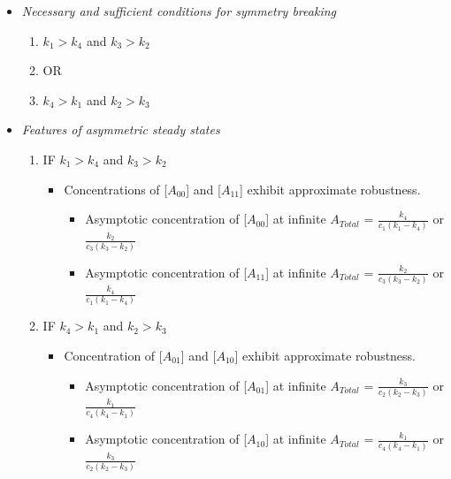 \documentclass[9pt,lineno]{elife}
\begin{document}
\begin{appendixbox}
\begin{itemize}
    \item \textit{Necessary and sufficient conditions for symmetry breaking}
        \begin{enumerate}
            \item $k_1 > k_4$ and $k_3 > k_2$ 
            \item[] \hspace{10mm} OR
            \item $k_4 > k_1$ and $k_2 > k_3$ 
        \end{enumerate}
    \item \textit{Features of asymmetric steady states}
    \begin{enumerate}
        \item IF $k_1 > k_4$ and $k_3 > k_2$ 
            \begin{itemize}
                \item Concentrations of [$A_{00}$] and [$A_{11}$] exhibit approximate robustness.
                    \begin{itemize}
                        \item Asymptotic concentration of [$A_{00}$] at infinite $A_{Total}$ = $\frac{k_4}{c_1(k_1-k_4)}$ or $\frac{k_2}{c_3(k_3-k_2)}$
                        \item Asymptotic concentration of [$A_{11}$] at infinite $A_{Total}$ = $\frac{k_2}{c_3(k_3-k_2)}$ or $\frac{k_4}{c_1(k_1-k_4)}$
                    \end{itemize}
            \end{itemize}
        \item IF $k_4 > k_1$ and $k_2 > k_3$ 
            \begin{itemize}
                \item Concentration of [$A_{01}$] and [$A_{10}$] exhibit approximate  robustness.
                    \begin{itemize}
                        \item Asymptotic concentration of [$A_{01}$] at infinite $A_{Total}$ = $\frac{k_3}{c_2(k_2-k_3)}$ or $\frac{k_1}{c_4(k_4-k_1)}$
                        \item Asymptotic concentration of [$A_{10}$] at infinite $A_{Total}$ = $\frac{k_1}{c_4(k_4-k_1)}$ or $\frac{k_3}{c_2(k_2-k_3)}$
                    \end{itemize}
            \end{itemize}
    \end{enumerate}
\end{itemize}


\end{appendixbox}
\end{document}
